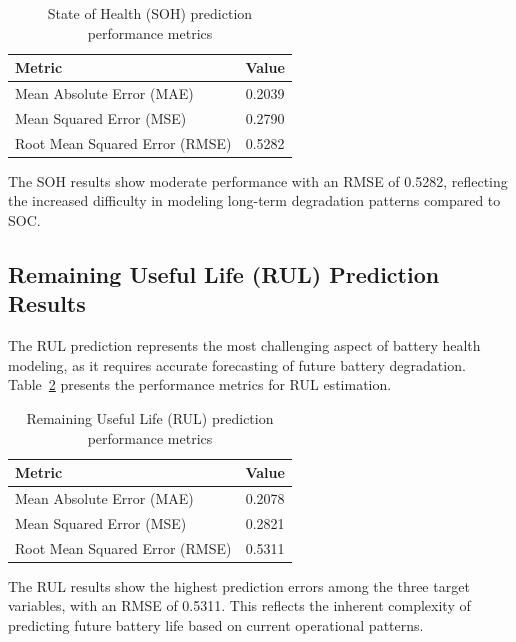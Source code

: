 \begin{table}[htbp]
\centering
\caption{State of Health (SOH) prediction performance metrics}
\label{tab:soh_results}
\begin{tabular}{lc}
\hline
\textbf{Metric} & \textbf{Value} \\
\hline
Mean Absolute Error (MAE) & 0.2039 \\
Mean Squared Error (MSE) & 0.2790 \\
Root Mean Squared Error (RMSE) & 0.5282 \\
\hline
\end{tabular}
\end{table}

The SOH results show moderate performance with an RMSE of 0.5282, reflecting the increased difficulty in modeling long-term degradation patterns compared to SOC.


\subsection{Remaining Useful Life (RUL) Prediction Results}
\label{subsec:rul_results}

The RUL prediction represents the most challenging aspect of battery health modeling, as it requires accurate forecasting of future battery degradation. Table~\ref{tab:rul_results} presents the performance metrics for RUL estimation.

\begin{table}[htbp]
\centering
\caption{Remaining Useful Life (RUL) prediction performance metrics}
\label{tab:rul_results}
\begin{tabular}{lc}
\hline
\textbf{Metric} & \textbf{Value} \\
\hline
Mean Absolute Error (MAE) & 0.2078 \\
Mean Squared Error (MSE) & 0.2821 \\
Root Mean Squared Error (RMSE) & 0.5311 \\
\hline
\end{tabular}
\end{table}

The RUL results show the highest prediction errors among the three target variables, with an RMSE of 0.5311. This reflects the inherent complexity of predicting future battery life based on current operational patterns.

